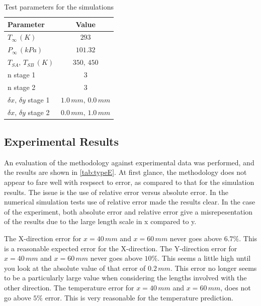 \documentclass[preprint,12pt]{elsarticle}
\begin{document}
\begin{table}[!h!t!b!p]
\begin{center}
\begin{tabular}{ l c}
\hline
Parameter & Value \\ \hline
$T_{\infty}\, (K)$ & $293$ \\
$P_{\infty}\, (kPa)$ & $101.32$ \\
$T_{SA},\, T_{SB}\, (K)$ & $350,\,450$ \\
n stage 1 & 3 \\
n stage 2 & 3 \\
$\delta x,\, \delta y $ stage 1 & $1.0\,mm,\,0.0\,mm$ \\
$\delta x,\, \delta y $ stage 2 & $0.0\,mm,\,1.0\,mm$ \\ \hline
 \end{tabular}
 \end{center}
\caption{Test parameters for the simulations}
\label{tab:simparam}
\end{table}


\subsection{Experimental Results}

An evaluation of the methodology against experimental data was performed, and the results are shown in \cref{tab:typeE}.  At first glance, the methodology does not appear to fare well with respsect to error, as compared to that for the simulation results.  The issue is the use of relative error versus absolute error.  In the numerical simulation tests use of relative error made the results clear.  In the case of the experiment, both absolute error and relative error give a misrepesentation of the results due to the large length scale in x compared to y.

The X-direction error for $x=40\, mm$ and $x=60\, mm$ never goes above $6.7\% $.  This is a reasonable expected error for the X-direction.  The Y-direction error for $x=40\, mm$ and $x=60\, mm$ never goes above $10\% $.  This seems a little high until you look at the absolute value of that error of $0.2\, mm$.  This error no longer seems to be a particularly large value when considering the lengths involved with the other direction.  The temperature error for $x=40\, mm$ and $x=60\, mm$, does not go above $5\% $ error.  This is very reasonable for the temperature prediction.
\end{document}
